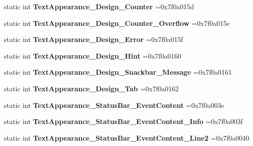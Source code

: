 \begin{DoxyCompactItemize}
static int {\bfseries Text\+Appearance\+\_\+\+Design\+\_\+\+Counter} =0x7f0a015d
\item 
\mbox{\label{classandroid_1_1support_1_1v4_1_1R_1_1style_a29cfc1cb8bd0e1f7cc969f7dd41d0588}} 
static int {\bfseries Text\+Appearance\+\_\+\+Design\+\_\+\+Counter\+\_\+\+Overflow} =0x7f0a015e
\item 
\mbox{\label{classandroid_1_1support_1_1v4_1_1R_1_1style_ac3624b6d2d4a34a358e8366d442dce9b}} 
static int {\bfseries Text\+Appearance\+\_\+\+Design\+\_\+\+Error} =0x7f0a015f
\item 
\mbox{\label{classandroid_1_1support_1_1v4_1_1R_1_1style_a5f88293a5c66c95a63da2c9d8c222d6b}} 
static int {\bfseries Text\+Appearance\+\_\+\+Design\+\_\+\+Hint} =0x7f0a0160
\item 
\mbox{\label{classandroid_1_1support_1_1v4_1_1R_1_1style_a29c0d04fb71cb552d6dcf063650753a5}} 
static int {\bfseries Text\+Appearance\+\_\+\+Design\+\_\+\+Snackbar\+\_\+\+Message} =0x7f0a0161
\item 
\mbox{\label{classandroid_1_1support_1_1v4_1_1R_1_1style_a114abfc2cc59c50a7dfad4079943e5f4}} 
static int {\bfseries Text\+Appearance\+\_\+\+Design\+\_\+\+Tab} =0x7f0a0162
\item 
\mbox{\label{classandroid_1_1support_1_1v4_1_1R_1_1style_afd483d6e2f7d9310375b821266a246a6}} 
static int {\bfseries Text\+Appearance\+\_\+\+Status\+Bar\+\_\+\+Event\+Content} =0x7f0a003e
\item 
\mbox{\label{classandroid_1_1support_1_1v4_1_1R_1_1style_a6ce4ca1bce9db7e646596fae10cb5689}} 
static int {\bfseries Text\+Appearance\+\_\+\+Status\+Bar\+\_\+\+Event\+Content\+\_\+\+Info} =0x7f0a003f
\item 
\mbox{\label{classandroid_1_1support_1_1v4_1_1R_1_1style_acff20b47693ea2e80d58ef36f5d3182b}} 
static int {\bfseries Text\+Appearance\+\_\+\+Status\+Bar\+\_\+\+Event\+Content\+\_\+\+Line2} =0x7f0a0040

\end{DoxyCompactItemize}

